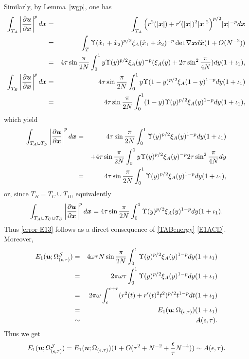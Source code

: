 \documentclass[12pt]{article}
\renewcommand{\vec}[1]{\mbox{\boldmath$#1$}}
\numberwithin{equation}{section}
\begin{document}
Similarly, by Lemma~\ref{wgp}, one has
\begin{eqnarray*}
\int_{T_A}\left| \frac{\partial \vec{u}}{\partial \vec{x}} \right|^p d\vec{x}
&=&\int_{T_A}\Big(r^2(|\vec{x}|)+r'(|\vec{x}|)^2
|\vec{x}|^2\Big)^{p/2}|\vec{x}|^{-p}d \vec{x}\\
&=&\int_{T}\Upsilon(\hat{x}_1+\hat{x}_2)^{p/2}\xi_A(\hat{x}_1+\hat{x}_2)^{-p}\det \nabla \vec{x}d\hat{\vec{x}}(1+O(N^{-2}))\\
&=&4\tau \sin{\frac{\pi}{2N}}\int_0^1 y\Upsilon(y)^{p/2}\xi_A(y)^{-p}(\xi_A(y)+
2\tau \sin^2\frac{\pi}{4N})dy(1+\iota_1), \\
\int_{T_B}\left| \frac{\partial  \vec{u}}{\partial \vec{x}} \right|^p d\vec{x}
&=&4\tau \sin{\frac{\pi}{2N}}\int_0^1 y\Upsilon(1-y)^{p/2}\xi_A(1-y)^{1-p}dy(1+\iota_1)\\
&=&4\tau \sin{\frac{\pi}{2N}}\int_0^1 (1-y)\Upsilon(y)^{p/2}\xi_A(y)^{1-p} dy(1+\iota_1),
\end{eqnarray*}
which yield
\begin{eqnarray} \label{E1AB}
\int_{T_A\cup T_B}\left| \frac{\partial \vec{u}}{\partial \vec{x}} \right|^p d\vec{x}
&=&4\tau \sin{\frac{\pi}{2N}}\int_0^1\Upsilon(y)^{p/2}\xi_A(y)^{1-p} dy(1+\iota_1)
\nonumber \\
&&+4\tau \sin{\frac{\pi}{2N}}\int_0^1y\Upsilon(y)^{p/2}\xi_A(y)^{-p}
2\tau \sin^2\frac{\pi}{4N}dy \nonumber \\
&=&4\tau \sin{\frac{\pi}{2N}}\int_0^1\Upsilon(y)^{p/2}\xi_A(y)^{1-p} dy(1+\iota_1),
\end{eqnarray}
or, since $T_B = T_C \cup T_D$, equivalently
\begin{equation}\label{E1ACD}
\int_{T_A\cup T_C \cup T_D}\left| \frac{\partial \vec{u}}{\partial \vec{x}} \right|^p
d\vec{x}=4\tau \sin{\frac{\pi}{2N}}\int_0^1\Upsilon(y)^{p/2}\xi_A(y)^{1-p} dy(1+\iota_1).
\end{equation}
Thus \eqref{error E13} follows as a direct consequence of \eqref{TABenergy}-\eqref{E1ACD}.
Moreover,
\begin{eqnarray*}
E_1(\vec{u};\Omega^{\mathcal{J}}_{(\epsilon,\tau)})&=&
4\omega \tau  N\sin{\frac{\pi}{2N}}\int_0^1\Upsilon(y)^{p/2}\xi_A(y)^{1-p} dy(1+\iota_1)\\
&=&2\pi \omega \tau \int_0^1\Upsilon(y)^{p/2}\xi_A(y)^{1-p} dy(1+\iota_1)\\
&=&2 \pi \omega \int_\epsilon^{\epsilon+\tau}
(r^2(t)+r'(t)^2t^2)^{p/2} t^{1-p} dt(1+\iota_1)\\
&=&E_1(\vec{u};\Omega_{(\epsilon,\tau)})(1+\iota_1)\\
&\sim &A(\epsilon,\tau).
\end{eqnarray*}
Thus we get
$$
E_1(\vec{u};\Omega^{\mathcal{J}}_{(\epsilon,\tau)})=
E_1(\vec{u};\Omega_{(\epsilon,\tau)})(1+O(\tau^2+N^{-2}+\frac{\epsilon}{\tau}N^{-4}))
\sim A(\epsilon,\tau).
$$
\end{document}
